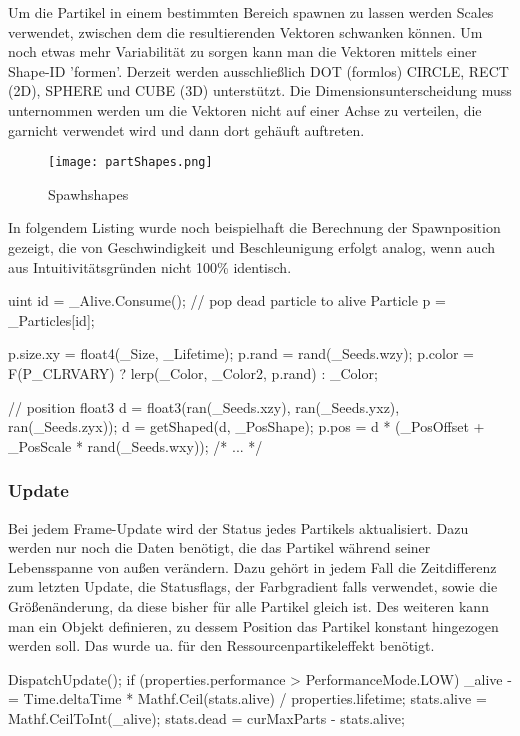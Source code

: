 Um die Partikel in einem bestimmten Bereich spawnen zu lassen werden Scales verwendet, zwischen dem die resultierenden Vektoren schwanken können. Um noch etwas mehr Variabilität zu sorgen kann man die Vektoren mittels einer Shape-ID 'formen'. Derzeit werden ausschlie{\ss}lich DOT (formlos) CIRCLE, RECT (2D), SPHERE und CUBE (3D) unterstützt. Die Dimensionsunterscheidung muss unternommen werden um die Vektoren nicht auf einer Achse zu verteilen, die garnicht verwendet wird und dann dort gehäuft auftreten.

\begin{figure}[H]
\centering
\texttt{[image: partShapes.png]}
\caption{Spawhshapes}
\label{img:partShapes}
\end{figure}

In folgendem Listing wurde noch beispielhaft die Berechnung der Spawnposition gezeigt, die von Geschwindigkeit und Beschleunigung erfolgt analog, wenn auch aus Intuitivitätsgründen nicht 100\% identisch.

\begin{hlsl}[caption=Compute Emit Kernel]
uint id = _Alive.Consume(); // pop dead particle to alive
Particle p = _Particles[id];

p.size.xy = float4(_Size, _Lifetime);
p.rand = rand(_Seeds.wzy);
p.color = F(P_CLRVARY) ? lerp(_Color, _Color2, p.rand) : _Color;

// position
float3 d = float3(ran(_Seeds.xzy), ran(_Seeds.yxz), ran(_Seeds.zyx));
d = getShaped(d, _PosShape);
p.pos = d * (_PosOffset + _PosScale * rand(_Seeds.wxy));
/* ... */
\end{hlsl}


\subsubsection{Update}

Bei jedem Frame-Update wird der Status jedes Partikels aktualisiert. Dazu werden nur noch die Daten benötigt, die das Partikel während seiner Lebensspanne von au{\ss}en verändern. Dazu gehört in jedem Fall die Zeitdifferenz zum letzten Update, die Statusflags, der Farbgradient falls verwendet, sowie die Grö{\ss}enänderung, da diese bisher für alle Partikel gleich ist. Des weiteren kann man ein Objekt definieren, zu dessem Position das Partikel konstant hingezogen werden soll. Das wurde ua. für den Ressourcenpartikeleffekt benötigt.

\begin{csh}[caption=Controller Update]
DispatchUpdate();
if (properties.performance > PerformanceMode.LOW)
{
    _alive -= Time.deltaTime * Mathf.Ceil(stats.alive) / properties.lifetime;
    stats.alive = Mathf.CeilToInt(_alive);
    stats.dead = curMaxParts - stats.alive;
}
\end{csh}

